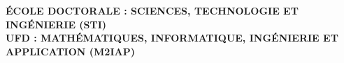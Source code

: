 \begin{titlepage}
\begin{center}
\begin{center}
	\textbf{ÉCOLE DOCTORALE : SCIENCES, TECHNOLOGIE ET INGÉNIERIE (STI)}\\[.09cm]
	\textbf{UFD : MATHÉMATIQUES, INFORMATIQUE, INGÉNIERIE ET APPLICATION (M2IAP)}	
\end{center}







\makebox[\linewidth]{\rule{\textwidth}{0.5pt}}
\begin{center}
	\textbf{}
\end{center}
\makebox[\linewidth]{\rule{\textwidth}{0.5pt}}


\end{center}
\end{titlepage}
